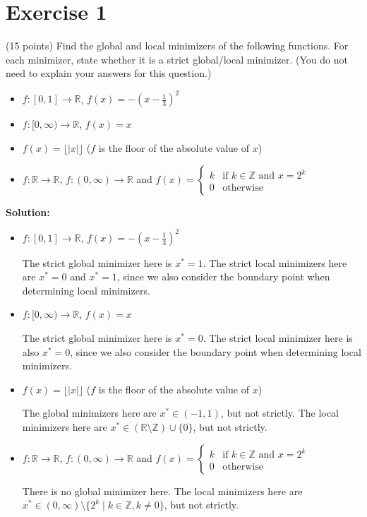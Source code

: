 \documentclass{article}
\begin{document}
\section*{Exercise 1}
(15 points) Find the global and local minimizers of the following functions. For each minimizer, state whether it is a strict global/local minimizer. (You do not need to explain your answers for this question.)

\begin{itemize}
    \item $f: [0,1] \to \mathbb{R}$, $f(x) = -(x-\frac{1}{3})^2$
    \item $f: [0,\infty) \to \mathbb{R}$, $f(x) = x$
    \item $f(x) = \lfloor|x|\rfloor$ ($f$ is the floor of the absolute value of $x$)
    \item $f: \mathbb{R} \to \mathbb{R}$, $f: (0,\infty) \to \mathbb{R}$ and $f(x) = \begin{cases} 
        k & \text{if } k \in \mathbb{Z} \text{ and } x = 2^k \\
        0 & \text{otherwise}
    \end{cases}$
\end{itemize}

\textbf{Solution:}

\begin{itemize}
    \item $f: [0,1] \to \mathbb{R}$, $f(x) = -(x-\frac{1}{3})^2$
    
    The strict global minimizer here is $x^* = 1$. The strict local minimizers here are $x^* = 0$ and $x^* = 1$, since we also consider the boundary point when determining local minimizers.
    \item $f: [0,\infty) \to \mathbb{R}$, $f(x) = x$
    
    The strict global minimizer here is $x^* = 0$. The strict local minimizer here is also $x^* = 0$, since we also consider the boundary point when determining local minimizers.
    \item $f(x) = \lfloor|x|\rfloor$ ($f$ is the floor of the absolute value of $x$)
    
    The global minimizers here are $x^* \in (-1, 1)$, but not strictly. The local minimizers here are $x^* \in (\mathbb{R} \setminus \mathbb{Z}) \cup \{0\}$, but not strictly.
    \item $f: \mathbb{R} \to \mathbb{R}$, $f: (0,\infty) \to \mathbb{R}$ and $f(x) = \begin{cases} 
        k & \text{if } k \in \mathbb{Z} \text{ and } x = 2^k \\
        0 & \text{otherwise}
    \end{cases}$

    There is no global minimizer here. The local minimizers here are $x^* \in (0, \infty) \setminus \{2^k \mid k \in \mathbb{Z}, k \neq 0\}$, but not strictly.
\end{itemize}
\end{document}
